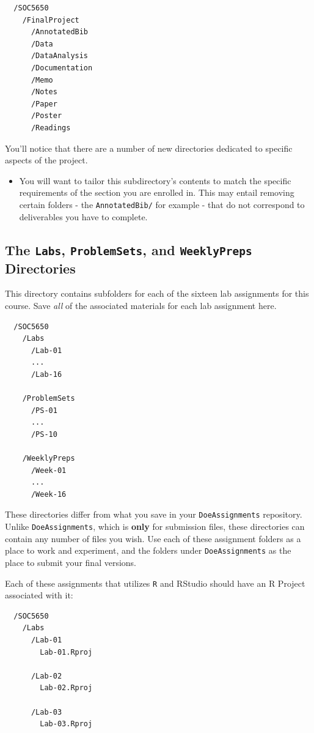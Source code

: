 \documentclass[]{book}
\newenvironment{rmdblock}[1]
  {\begin{shaded*}
  \begin{itemize}
  \renewcommand{\labelitemi}{
    \raisebox{-.7\height}[0pt][0pt]{
      {\setkeys{Gin}{width=3em,keepaspectratio}\texttt{[image: images/\#1]}}
    }
  }
  \item
  }
  {
  \end{itemize}
  \end{shaded*}
  }
\newenvironment{rmdnote}
  {\begin{rmdblock}{note}}
  {\end{rmdblock}}
\theoremstyle{definition}
\theoremstyle{definition}
\theoremstyle{definition}
\theoremstyle{remark}
\begin{document}
\begin{verbatim}
  /SOC5650
    /FinalProject
      /AnnotatedBib
      /Data
      /DataAnalysis
      /Documentation
      /Memo
      /Notes
      /Paper
      /Poster
      /Readings
\end{verbatim}

You'll notice that there are a number of new directories dedicated to
specific aspects of the project.

\begin{rmdnote}
You will want to tailor this subdirectory's contents to match the
specific requirements of the section you are enrolled in. This may
entail removing certain folders - the \texttt{AnnotatedBib/} for example
- that do not correspond to deliverables you have to complete.
\end{rmdnote}

\subsection{\texorpdfstring{The \texttt{Labs}, \texttt{ProblemSets}, and
\texttt{WeeklyPreps}
Directories}{The Labs, ProblemSets, and WeeklyPreps Directories}}\label{the-labs-problemsets-and-weeklypreps-directories}

This directory contains subfolders for each of the sixteen lab
assignments for this course. Save \emph{all} of the associated materials
for each lab assignment here.

\begin{verbatim}
  /SOC5650
    /Labs
      /Lab-01
      ...
      /Lab-16
      
    /ProblemSets
      /PS-01
      ...
      /PS-10
      
    /WeeklyPreps
      /Week-01
      ...
      /Week-16
\end{verbatim}

These directories differ from what you save in your
\texttt{DoeAssignments} repository. Unlike \texttt{DoeAssignments},
which is \textbf{only} for submission files, these directories can
contain any number of files you wish. Use each of these assignment
folders as a place to work and experiment, and the folders under
\texttt{DoeAssignments} as the place to submit your final versions.

Each of these assignments that utilizes \texttt{R} and RStudio should
have an R Project associated with it:

\begin{verbatim}
  /SOC5650
    /Labs
      /Lab-01
        Lab-01.Rproj
        
      /Lab-02
        Lab-02.Rproj
        
      /Lab-03
        Lab-03.Rproj
\end{verbatim}
\end{document}
